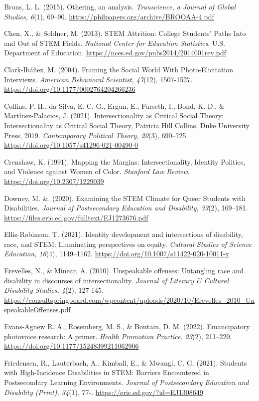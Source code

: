 \documentclass{sig-alternate} %
\begin{document}
Brons, L. L. (2015). Othering, an analysis. \textit{Transcience, a Journal of Global Studies, 6}(1), 69–90. \url{https://philpapers.org/archive/BROOAA-4.pdf}

Chen, X., \& Soldner, M. (2013). STEM Attrition: College Students' Paths Into and Out of STEM Fields. \textit{National Center for Education Statistics}. U.S. Department of Education. \url{https://nces.ed.gov/pubs2014/2014001rev.pdf}

Clark-Ibáñez, M. (2004). Framing the Social World With Photo-Elicitation Interviews. \textit{American Behavioral Scientist, 47}(12), 1507-1527. \url{https://doi.org/10.1177/0002764204266236}

Collins, P. H., da Silva, E. C. G., Ergun, E., Furseth, I., Bond, K. D., \& Martínez-Palacios, J. (2021). Intersectionality as Critical Social Theory: Intersectionality as Critical Social Theory, Patricia Hill Collins, Duke University Press, 2019. \textit{Contemporary Political Theory, 20}(3), 690–725. \url{https://doi.org/10.1057/s41296-021-00490-0}

Crenshaw, K. (1991). Mapping the Margins: Intersectionality, Identity Politics, and Violence against Women of Color. \textit{Stanford Law Review}. \url{https://doi.org/10.2307/1229039}

Downey, M. \&. (2020). Examining the STEM Climate for Queer Students with Disabilities. \textit{Journal of Postsecondary Education and Disability, 33}(2), 169–181. \url{https://files.eric.ed.gov/fulltext/EJ1273676.pdf}

Ellis-Robinson, T. (2021). Identity development and intersections of disability, race, and STEM: Illuminating perspectives on equity. \textit{Cultural Studies of Science Education, 16}(4), 1149–1162. \url{https://doi.org/10.1007/s11422-020-10011-x}

Erevelles, N., \& Minear, A. (2010). Unspeakable offenses: Untangling race and disability in discourses of intersectionality. \textit{Journal of Literary \& Cultural Disability Studies, 4}(2), 127-145. \url{https://consultspringboard.com/wpcontent/uploads/2020/10/Erevelles_2010_UnspeakableOffenses.pdf}

Evans-Agnew R. A., Rosemberg, M. S., \& Boutain, D. M. (2022). Emancipatory photovoice research: A primer. \textit{Health Promotion Practice, 23}(2), 211–220. \url{https://doi.org/10.1177/15248399211062906}

Friedensen, R., Lauterbach, A., Kimball, E., \& Mwangi, C. G. (2021). Students with High-Incidence Disabilities in STEM: Barriers Encountered in Postsecondary Learning Environments. \textit{Journal of Postsecondary Education and Disability (Print), 34}(1), 77-. \url{https://eric.ed.gov/?id=EJ1308649}
\end{document}
